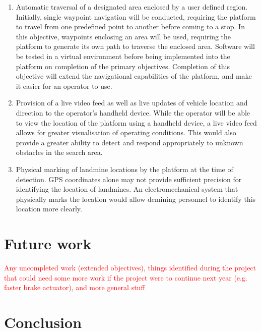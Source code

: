 \documentclass[main.tex]{subfiles}
\begin{document}
\begin{enumerate}
\item Automatic traversal of a designated area enclosed by a user defined region. Initially, single waypoint navigation will be conducted, requiring the platform to travel from one predefined point to another before coming to a stop. In this objective, waypoints enclosing an area will be used, requiring the platform to generate its own path to traverse the enclosed area. Software will be tested in a virtual environment before being implemented into the platform on completion of the primary objectives. Completion of this objective will extend the navigational capabilities of the platform, and make it easier for an operator to use. 

\item Provision of a live video feed as well as live updates of vehicle location and direction to the operator's handheld device. While the operator will be able to view the location of the platform using a handheld device, a live video feed allows for greater visualisation of operating conditions. This would also provide a greater ability to detect and respond appropriately to unknown obstacles in the search area.

\item Physical marking of landmine locations by the platform at the time of detection. GPS coordinates alone may not provide sufficient precision for identifying the location of landmines. An electromechanical system that physically marks the location would allow demining personnel to identify this location more clearly.
\end{enumerate}

\section{Future work}
\textcolor{red}{Any uncompleted work (extended objectives), things identified during the project that could need some more work if the project were to continue next year (e.g. faster brake actuator), and more general stuff}

\section{Conclusion}
\end{document}
